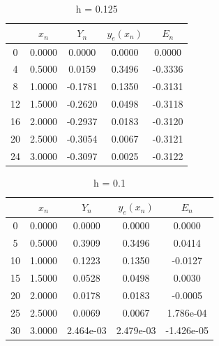 \documentclass[11pt]{article}
\begin{document}
\begin{table}[H]
\centering
\caption{h = 0.125}                         
\begin{tabular}{|c|c|c|c|c|}              
\hline                                     
 & $x_{n}$ & $Y_{n} $& $y_{e}(x_{n})$ & $E_{n}$\\               
\hline                                     
0 & 0.0000 & 0.0000 & 0.0000 & 0.0000 \\   
\hline                                   
4 & 0.5000 & 0.0159 & 0.3496 & -0.3336 \\                                       
\hline                                     
8 & 1.0000 & -0.1781 & 0.1350 & -0.3131 \\ 
\hline                                                                      
12 & 1.5000 & -0.2620 & 0.0498 & -0.3118 \\
\hline                                                                      
16 & 2.0000 & -0.2937 & 0.0183 & -0.3120 \\
\hline                                                                       
20 & 2.5000 & -0.3054 & 0.0067 & -0.3121 \\
\hline                                                                      
24 & 3.0000 & -0.3097 & 0.0025 & -0.3122 \\
\hline                 
\end{tabular}                                                    
\end{table}  
                
\begin{table}[!htb]
\centering
        \caption{h = 0.1}                  
\begin{tabular}{|c|c|c|c|c|}            
\hline                                     
 & $x_{n}$ & $Y_{n} $& $y_{e}(x_{n})$ & $E_{n}$\\        
\hline                                     
0 & 0.0000 & 0.0000 & 0.0000 & 0.0000 \\  
\hline                                                                  
5 & 0.5000 & 0.3909 & 0.3496 & 0.0414 \\  
\hline                                    
10 & 1.0000 & 0.1223 & 0.1350 & -0.0127 \\
\hline                                   
15 & 1.5000 & 0.0528 & 0.0498 & 0.0030 \\ 
\hline                                                           
20 & 2.0000 & 0.0178 & 0.0183 & -0.0005 \\
\hline                                                               
25 & 2.5000 & 0.0069 & 0.0067 &1.786e-04 \\ 
\hline                                                                   
30 & 3.0000 &2.464e-03 & 2.479e-03 & -1.426e-05\\
\hline                                     
\end{tabular}                                   
\end{table}
    
\end{document}
